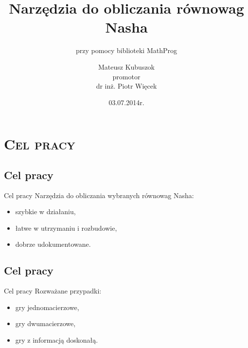 \documentclass[xcolor=x11names,compress]{beamer}
\renewcommand{\(}{\begin{columns}}
\renewcommand{\)}{\end{columns}}
\newcommand{\<}[1]{\begin{column}{#1}}
\renewcommand{\>}{\end{column}}
\begin{document}
\begin{frame}
\title{Narzędzia do obliczania równowag Nasha}
\subtitle{przy pomocy biblioteki MathProg}
\author[M. Kubuszok]{
  Mateusz Kubuszok\\
  \bigskip
  \tiny{promotor}\\
  \scriptsize{dr inż. Piotr Więcek}\\
}
\date[Lipiec 2014]{\tiny{03.07.2014r.}}
\titlepage
\end{frame}


\section{\scshape Cel pracy}

\subsection{Cel pracy}
\begin{frame}{Cel pracy}
Narzędzia do obliczania wybranych równowag Nasha:
\begin{itemize}
\item szybkie w działaniu,
\item łatwe w utrzymaniu i rozbudowie,
\item dobrze udokumentowane.
\end{itemize}
\end{frame}

\subsection{Cel pracy}
\begin{frame}{Cel pracy}
Rozważane przypadki:
\begin{itemize}
\item gry jednomacierzowe,
\item gry dwumacierzowe,
\item gry z informacją doskonałą.
\end{itemize}
\end{frame}
\end{document}
